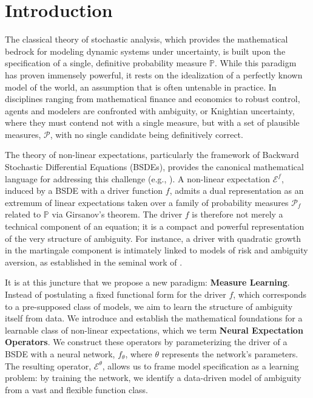 \documentclass[qian]{imsart}
\newcommand{\Prob}{\mathbb{P}}
\newcommand{\cEneutheta}{\mathcal{E}^{\theta}}
\theoremstyle{plain}
\theoremstyle{definition}
\begin{document}
\section{Introduction}

The classical theory of stochastic analysis, which provides the mathematical bedrock for modeling dynamic systems under uncertainty, is built upon the specification of a single, definitive probability measure $\mathbb{P}$. While this paradigm has proven immensely powerful, it rests on the idealization of a perfectly known model of the world, an assumption that is often untenable in practice. In disciplines ranging from mathematical finance and economics to robust control, agents and modelers are confronted with ambiguity, or Knightian uncertainty, where they must contend not with a single measure, but with a set of plausible measures, $\mathcal{P}$, with no single candidate being definitively correct.

The theory of non-linear expectations, particularly the framework of Backward Stochastic Differential Equations (BSDEs), provides the canonical mathematical language for addressing this challenge (e.g., \cite{ElKarouiPengQuenez1997, PardouxPeng1990, Peng2010}). A non-linear expectation $\mathcal{E}^f$, induced by a BSDE with a driver function $f$, admits a dual representation as an extremum of linear expectations taken over a family of probability measures $\mathcal{P}_f$ related to $\Prob$ via Girsanov's theorem. The driver $f$ is therefore not merely a technical component of an equation; it is a compact and powerful representation of the very structure of ambiguity. For instance, a driver with quadratic growth in the martingale component is intimately linked to models of risk and ambiguity aversion, as established in the seminal work of \cite{Kobylanski2000}.

It is at this juncture that we propose a new paradigm: \textbf{Measure Learning}. Instead of postulating a fixed functional form for the driver $f$, which corresponds to a pre-supposed class of models, we aim to learn the structure of ambiguity itself from data. We introduce and establish the mathematical foundations for a learnable class of non-linear expectations, which we term \textbf{Neural Expectation Operators}. We construct these operators by parameterizing the driver of a BSDE with a neural network, $f_\theta$, where $\theta$ represents the network's parameters. The resulting operator, $\cEneutheta$, allows us to frame model specification as a learning problem: by training the network, we identify a data-driven model of ambiguity from a vast and flexible function class.
\end{document}
